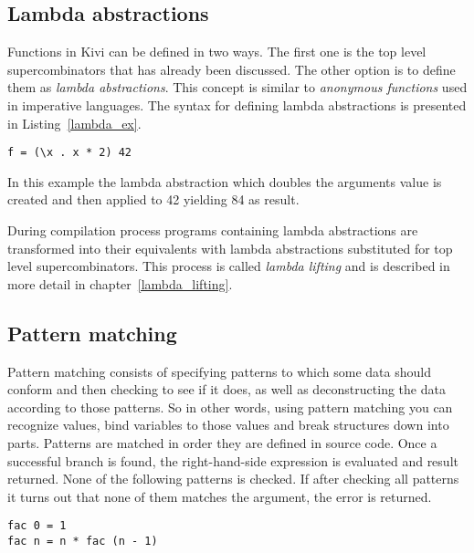 \documentclass[12pt,a4paper]{report}
\begin{document}
\subsection{Lambda abstractions}
Functions in Kivi can be defined in two ways. The first one is the top level
supercombinators that has already been discussed. The other option is to define
them as \textit{lambda abstractions}. This concept is similar to \textit{anonymous
functions} used in imperative languages. The syntax for defining lambda
abstractions is presented in Listing~\ref{lambda_ex}.

\hspace*{-1.5in}
\begin{lstlisting}[style=haskell,label=lambda_ex,caption={Lambda abstraction}]
f = (\x . x * 2) 42
\end{lstlisting}

In this example the lambda abstraction which doubles the arguments value is
created and then applied to 42 yielding 84 as result.

During compilation process programs containing lambda abstractions are
transformed into their equivalents with lambda abstractions substituted for top
level supercombinators. This process is called \textit{lambda lifting} and is
described in more detail in chapter~\ref{lambda_lifting}.

\subsection{Pattern matching}

Pattern matching consists of specifying patterns to which some data should
conform and then checking to see if it does, as well as deconstructing the data
according to those patterns. So in other words, using pattern matching you can
recognize values, bind variables to those values and break structures down into
parts.
Patterns are matched in order they are defined in source code. Once a
successful branch is found, the right-hand-side expression is evaluated and
result returned. None of the following patterns is checked. If after checking
all patterns it turns out that none of them matches the argument, the error is
returned.

\hspace*{-1.5in}
\begin{lstlisting}[style=haskell,label=pattern_matching_ex,caption={Factorial using pattern matching.}]
fac 0 = 1
fac n = n * fac (n - 1)
\end{lstlisting}
\end{document}
